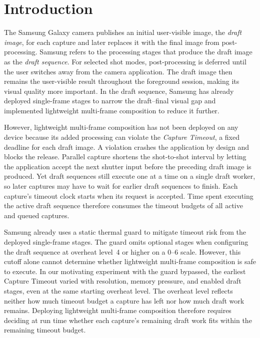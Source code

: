 \section{Introduction}

\label{sec:introduction}

The Samsung Galaxy camera publishes an initial user-visible image, the \emph{draft image}, for each capture and later replaces it with the final image from post-processing.
Samsung refers to the processing stages that produce the draft image as the \emph{draft sequence}.
For selected shot modes, post-processing is deferred until the user switches away from the camera application.
The draft image then remains the user-visible result throughout the foreground session, making its visual quality more important.
In the draft sequence, Samsung has already deployed single-frame stages to narrow the draft--final visual gap and implemented lightweight multi-frame composition to reduce it further.

However, lightweight multi-frame composition has not been deployed on any device because its added processing can violate the \emph{Capture Timeout}, a fixed deadline for each draft image.
A violation crashes the application by design and blocks the release.
Parallel capture shortens the shot-to-shot interval by letting the application accept the next shutter input before the preceding draft image is produced.
Yet draft sequences still execute one at a time on a single draft worker, so later captures may have to wait for earlier draft sequences to finish.
Each capture's timeout clock starts when its request is accepted.
Time spent executing the active draft sequence therefore consumes the timeout budgets of all active and queued captures.

Samsung already uses a static thermal guard to mitigate timeout risk from the deployed single-frame stages.
The guard omits optional stages when configuring the draft sequence at overheat level~4 or higher on a 0--6 scale.
However, this cutoff alone cannot determine whether lightweight multi-frame composition is safe to execute.
In our motivating experiment with the guard bypassed, the earliest Capture Timeout varied with resolution, memory pressure, and enabled draft stages, even at the same starting overheat level.
The overheat level reflects neither how much timeout budget a capture has left nor how much draft work remains.
Deploying lightweight multi-frame composition therefore requires deciding at run time whether each capture's remaining draft work fits within the remaining timeout budget.


